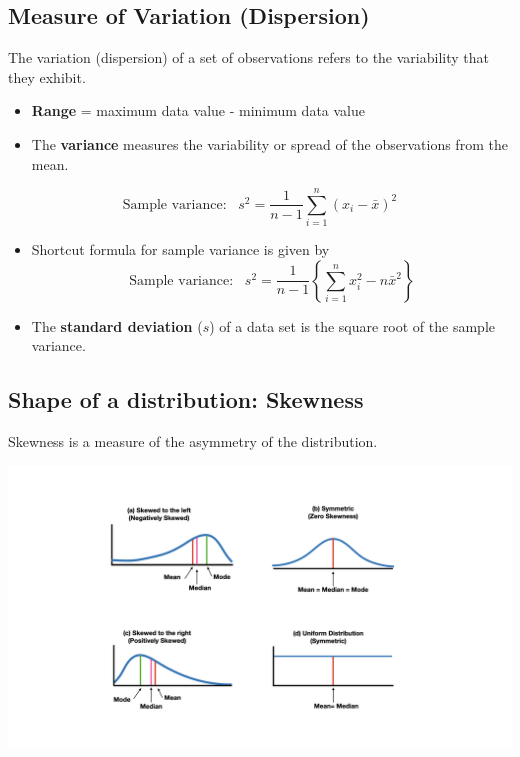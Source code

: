\documentclass[
]{article}
\begin{document}
\hypertarget{measure-of-variation-dispersion}{%
\subsection{Measure of Variation
(Dispersion)}\label{measure-of-variation-dispersion}}

The variation (dispersion) of a set of observations refers to the
variability that they exhibit.

\begin{itemize}
\item
  \textbf{Range} = maximum data value - minimum data value
\item
  The \textbf{variance} measures the variability or spread of the
  observations from the mean.
\end{itemize}

\[\text{Sample variance:}\;\;\;s^2=\frac{1}{n-1}\sum_{i=1}^{n}(x_i-\bar{x})^2\]

\begin{itemize}
\item
  Shortcut formula for sample variance is given by
  \[\text{Sample variance:}\;\;\;s^2=\frac{1}{n-1}\left\{\sum_{i=1}^{n}x^2_i-n\bar{x}^2\right\}\]
\item
  The \textbf{standard deviation} (\(s\)) of a data set is the square
  root of the sample variance.
\end{itemize}

\hypertarget{shape-of-a-distribution-skewness}{%
\subsection{Shape of a distribution:
Skewness}\label{shape-of-a-distribution-skewness}}

Skewness is a measure of the asymmetry of the distribution.

\begin{center}\includegraphics[width=1.3\linewidth,height=1.3\textheight]{skewed} \end{center}
\end{document}
